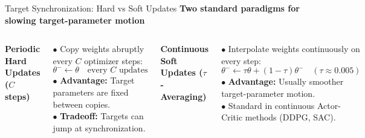 \documentclass[aspectratio=169,10pt]{beamer}
\newcommand{\sectionlabel}[1]{%
  {\small\bfseries\color{islteal}#1}\par\vspace{0.14cm}%
}
\begin{document}
\begin{frame}{Target Synchronization: Hard vs Soft Updates}
  \sectionlabel{Two standard paradigms for slowing target-parameter motion}

  \begin{columns}[T,onlytextwidth]
      {\small\bfseries\color{islteal} Periodic Hard Updates ($C$ steps)}\par\vspace{0.08cm}
      {\footnotesize
      $\bullet$ Copy weights abruptly every $C$ optimizer steps:
      $$\theta^- \leftarrow \theta \quad \text{every } C \text{ updates}$$
      $\bullet$ \textbf{Advantage:} Target parameters are fixed between copies.\\[2pt]
      $\bullet$ \textbf{Tradeoff:} Targets can jump at synchronization.}

      {\small\bfseries\color{islnavy} Continuous Soft Updates ($\tau$-Averaging)}\par\vspace{0.08cm}
      {\footnotesize
      $\bullet$ Interpolate weights continuously on every step:
      $$\theta^- \leftarrow \tau \theta + (1 - \tau)\theta^- \quad (\tau \approx 0.005)$$
      $\bullet$ \textbf{Advantage:} Usually smoother target-parameter motion.\\[2pt]
      $\bullet$ Standard in continuous Actor-Critic methods (DDPG, SAC).}
  \end{columns}
\end{frame}
\end{document}

